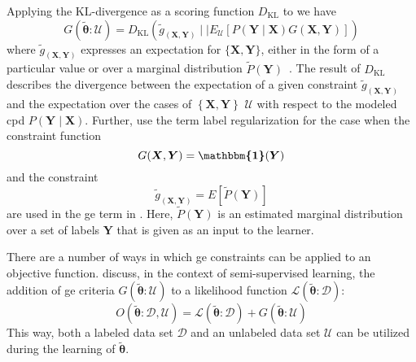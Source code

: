 Applying the $\text{KL}$-divergence as a scoring function $D_{\text{KL}}$ to  we have~\citep{mann2010generalized}
\begin{equation}
  \label{equ:generalized-expectation-kl}
  G(\bm{\tilde{\theta}}:\mathcal{U})=D_{\text{KL}}\left(\tilde{g}_{\left(\bm{X},\bm{Y}\right)}\mid\mid E_{\mathcal{U}}\left[P(\bm{Y}\mid\bm{X})G(\bm{X},\bm{Y})\right]\right)
\end{equation}
where $\tilde{g}_{\left(\bm{X},\bm{Y}\right)}$ expresses an expectation for $\{\bm{X},\bm{Y}\}$, either in the form of a particular value or over a \gls{marginal distribution} $\tilde{P}\left(\bm{Y}\right)$~\citep{mann2010generalized}.
The result of $D_{\text{KL}}$ describes the divergence between the expectation of a given constraint $\tilde{g}_{\left(\bm{X},\bm{Y}\right)}$ and the expectation over the cases of $\left\{\bm{X},\bm{Y}\right\}$ $\mathcal{U}$ with respect to the modeled \gls{cpd} $P(\bm{Y}\mid\bm{X})$.
Further, \citet{mann2010generalized} use the term \gls{label regularization} for the case when the constraint function
\begin{equation}
  \label{equ:label-regularization-constraint-function}
  G(\bm{X},\bm{Y})=\bm{\mathbbm{1}}(\bm{Y})
\end{equation}
and the constraint
\begin{equation}
  \label{equ:label-regularization-constraints}
  \tilde{g}_{\left(\bm{X},\bm{Y}\right)}=E[\tilde{P}(\bm{Y})]
\end{equation}
are used in the \gls{ge} term in .
Here, $\tilde{P}(\bm{Y})$ is an estimated \gls{marginal distribution} over a set of labels $\bm{Y}$ that is given as an input to the learner.

\bigskip

There are a number of ways in which \gls{ge} constraints can be applied to an \gls{objective function}.
\citet{mann2010generalized} discuss, in the context of semi-supervised learning, the addition of \gls{ge} criteria $G(\bm{\tilde{\theta}}:\mathcal{U})$ to a likelihood function $\mathcal{L}(\bm{\tilde{\theta}}:\mathcal{D})$:
\begin{equation}
  \label{equ:objective-function-l-g}
  O(\bm{\tilde{\theta}}:\mathcal{D},\mathcal{U})=\mathcal{L}(\bm{\tilde{\theta}}:\mathcal{D})+G(\bm{\tilde{\theta}}:\mathcal{U})
\end{equation}
This way, both a labeled data set $\mathcal{D}$ and an unlabeled data set $\mathcal{U}$ can be utilized during the learning of $\bm{\tilde{\theta}}$.

